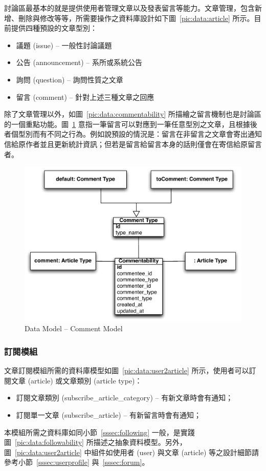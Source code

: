 討論區最基本的就是提供使用者管理文章以及發表留言等能力。文章管理，包含新增、刪除與修改等等，所需要操作之資料庫設計如下圖~\ref{pic:data:article} 所示。目前提供四種預設的文章型別：
\begin{itemize}
\item 議題 (issue) -- 一般性討論議題
\item 公告 (announcement) -- 系所或系統公告
\item 詢問 (question) -- 詢問性質之文章
\item 留言 (comment) -- 針對上述三種文章之回應
\end{itemize}

除了文章管理以外，如圖~\ref{pic:data:commentability} 所描繪之留言機制也是討論區的一個重點功能。圖~\ref{pic:data:comment2article} 意指一筆留言可以對應到一筆任意型別之文章，且根據後者個型別而有不同之行為。例如說預設的情況是：留言在非留言之文章會寄出通知信給原作者並且更新統計資訊；但若是留言給留言本身的話則僅會在寄信給原留言者。

\begin{figure}[H]
\centering
\includegraphics[width=\textwidth]{img/comment2article.pdf}
\caption{Data Model -- Comment Model}
\label{pic:data:comment2article}
\end{figure}

\subsubsection{訂閱模組}
\label{sssec:subscription}

文章訂閱模組所需的資料庫模型如圖~\ref{pic:data:user2article} 所示，使用者可以訂閱文章 (article) 或文章類別 (article type)：
\begin{itemize}
\item{訂閱文章類別 (subscribe\_article\_category) -- 有新文章時會有通知；}
\item{訂閱單一文章 (subscribe\_article) -- 有新留言時會有通知；}
\end{itemize}
本模組所需之資料庫如同小節~\ref{sssec:following} 一般，是實踐圖~\ref{pic:data:followability} 所描述之抽象資料模型。另外，圖~\ref{pic:data:user2article} 中組件如使用者 (user) 與文章 (article) 等之設計細節請參考小節~\ref{sssec:userprofile} 與~\ref{sssec:forum}。

